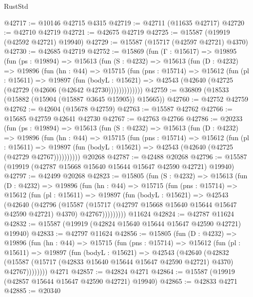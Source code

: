 \begin{lexlean}{RustStd}
\begin{coremodule}
@42717 := @10146 @42715 @4315
@42719 := @42711 (@11635 @42717)
@42720 := @42710 @42719
@42721 := @42675 @42719
@42725 := @15587 (@19919 (@42592 @42721) @19940)
@42729 := @15587 (@15717 (@42597 @42721) @4370)
@42730 := @42685 @42719
@42752 := @15869
    (fun (Γ : @15617) =>
    @19895
      (fun (ps : @19894) =>
      @15613
        (fun (S : @4232) =>
        @15613
          (fun (D : @4232) =>
          @19896
            (fun (hn : @44) =>
            @15715
              (fun (pns : @15714) =>
              @15612
                (fun (pl : @15611) =>
                @19897
                  (fun (bodyL : @15621) =>
                  @42543 (@42640 (@42725 (@42729 (@42606 (@42642 @42730)))))))))))))
@42759 := @36809 (@18533 (@15882 (@15904 (@15887 @3645 @15905)) @15665))
@42760 := @42752 @42759
@42762 := @42604 (@15678 @42759)
@42763 := @15587 @42762
@42766 := @15685 @42759 @42641 @42730
@42767 := @42763 @42766
@42786 := @20233
    (fun (ps : @19894) =>
    @15613
      (fun (S : @4232) =>
      @15613
        (fun (D : @4232) =>
        @19896
          (fun (hn : @44) =>
          @15715
            (fun (pns : @15714) =>
            @15612
              (fun (pl : @15611) =>
              @19897 (fun (bodyL : @15621) => @42543 (@42640 (@42725 (@42729 @42767))))))))))
    @20268
@42787 := @42488 @20268
@42796 := @15587 (@19919 (@42787 @15668 @15640 @15644 @15647 @42590 @42721) @19940)
@42797 := @42499 @20268
@42823 := @15805
    (fun (S : @4232) =>
    @15613
      (fun (D : @4232) =>
      @19896
        (fun (hn : @44) =>
        @15715
          (fun (pns : @15714) =>
          @15612
            (fun (pl : @15611) =>
            @19897
              (fun (bodyL : @15621) =>
              @42543
                (@42640
                  (@42796
                    (@15587
                      (@15717 (@42797 @15668 @15640 @15644 @15647 @42590 @42721) @4370)
                      @42767)))))))))
    @11624
@42824 := @42787 @11624
@42832 := @15587 (@19919 (@42824 @15640 @15644 @15647 @42590 @42721) @19940)
@42833 := @42797 @11624
@42856 := @15805
    (fun (D : @4232) =>
    @19896
      (fun (hn : @44) =>
      @15715
        (fun (pns : @15714) =>
        @15612
          (fun (pl : @15611) =>
          @19897
            (fun (bodyL : @15621) =>
            @42543
              (@42640
                (@42832
                  (@15587 (@15717 (@42833 @15640 @15644 @15647 @42590 @42721) @4370) @42767))))))))
    @4271
@42857 := @42824 @4271
@42864 := @15587 (@19919 (@42857 @15644 @15647 @42590 @42721) @19940)
@42865 := @42833 @4271
@42885 := @20340

\end{coremodule}
\end{lexlean}
